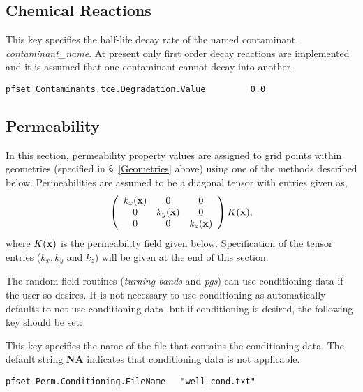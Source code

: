 \subsection{Chemical Reactions}
\label{Chemical Reactions}

{
This key specifies the half-life decay rate of the named contaminant,
{\em contaminant\_name}.  At present only first order decay reactions
are implemented and it is assumed that one contaminant cannot decay
into another.
}
\begin{display}\begin{verbatim}
pfset Contaminants.tce.Degradation.Value         0.0
\end{verbatim}\end{display}


\subsection{Permeability}
\label{Permeability}

In this section, permeability property values are assigned to grid
points within geometries (specified in \S~\ref{Geometries} above)
using one of the methods described below.  Permeabilities are assumed to be a
diagonal tensor with entries given as,
\[ 
\left( 
\begin{array}{ccc}
k_x({\bf x}) & 0 & 0 \\
0 & k_y({\bf x}) & 0 \\
0 & 0 & k_z({\bf x}) 
\end{array} \right) 
K({\bf x}),
\]
where $K({\bf x})$ is the permeability field given below.  Specification of the
tensor entries ($k_x, k_y$ and $k_z$) will be given at the end of this section.

The random field routines ({\em turning bands} and {\em pgs}) can use
conditioning data if the user so desires.  It is not necessary to use
conditioning as
\parflow{} automatically defaults to not use conditioning data, but
if conditioning is desired, the following key should be set:

{
This key specifies the name of the file that contains the conditioning
data.  The default string {\bf NA} indicates that conditioning data is
not applicable.
}
\begin{display}\begin{verbatim}
pfset Perm.Conditioning.FileName   "well_cond.txt"
\end{verbatim}\end{display}

